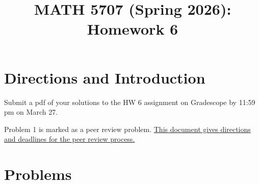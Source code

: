 \documentclass[12pt]{article}
\title{MATH 5707 (Spring 2026): Homework 6}
\date{}
\begin{document}
\vspace{-0.7in}

\maketitle
\vspace{-0.6in}


\section*{Directions and Introduction}
Submit a pdf of your solutions to the HW 6 assignment on Gradescope by 11:59 pm on March 27.

Problem 1 is marked as a peer review problem. \href{https://docs.google.com/document/d/1jSw9pmMJJFUx_6dTkcUi4k4HJNIrrIIgs9zdWhAycx0/edit?usp=sharing}{This document gives directions and deadlines for the peer review process.}



\section*{Problems}
\end{document}
